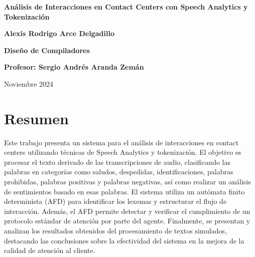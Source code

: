 \documentclass[12pt,a4paper]{article}
\begin{document}
\begin{titlepage}
    \begin{center}
        \vspace*{1cm}
        
        \textbf{\LARGE{Análisis de Interacciones en Contact Centers con 
        Speech Analytics y Tokenización}}
        
        \vspace{2cm}
        
        \textbf{\large{Alexis Rodrigo Arce Delgadillo}}
        
        \vfill
        
        \textbf{\large{Diseño de Compiladores}}
        
        \vspace{0.5cm}
        
        \textbf{\large{Profesor: Sergio Andrés Aranda Zemán}}
        
        \vspace{1.5cm}
        
        Noviembre 2024
        
        \vfill
        
    \end{center}
\end{titlepage}

\vspace{7mm}


\tableofcontents
\newpage

\section*{\centering Resumen}
Este trabajo presenta un sistema para el análisis de interacciones en contact centers utilizando técnicas de Speech Analytics y tokenización. El objetivo es procesar el texto derivado de las transcripciones de audio, clasificando las palabras en categorías como saludos, despedidas, identificaciones, palabras prohibidas, palabras positivas y palabras negativas, así como realizar un análisis de sentimientos basado en esas palabras. El sistema utiliza un autómata finito determinista (AFD) para identificar los lexemas y estructurar el flujo de interacción. Además, el AFD permite detectar y verificar el cumplimiento de un protocolo estándar de atención por parte del agente. Finalmente, se presentan y analizan los resultados obtenidos del procesamiento de textos simulados, destacando las conclusiones sobre la efectividad del sistema en la mejora de la calidad de atención al cliente.
\end{document}

